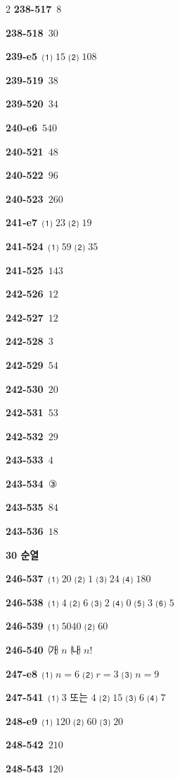 \documentclass[10pt,a4paper]{article}
\begin{document}
\begin{multicols}{2}
\noindent\textbf{238-517}\ $8$\par
\noindent\textbf{238-518}\ $30$\par
\noindent\textbf{239-e5}\ ⑴ $15$ ⑵ $108$\par
\noindent\textbf{239-519}\ $38$\par
\noindent\textbf{239-520}\ $34$\par
\noindent\textbf{240-e6}\ $540$\par
\noindent\textbf{240-521}\ $48$\par
\noindent\textbf{240-522}\ $96$\par
\noindent\textbf{240-523}\ $260$\par
\noindent\textbf{241-e7}\ ⑴ $23$ ⑵ $19$\par
\noindent\textbf{241-524}\ ⑴ $59$ ⑵ $35$\par
\noindent\textbf{241-525}\ $143$\par
\noindent\textbf{242-526}\ $12$\par
\noindent\textbf{242-527}\ $12$\par
\noindent\textbf{242-528}\ $3$\par
\noindent\textbf{242-529}\ $54$\par
\noindent\textbf{242-530}\ $20$\par
\noindent\textbf{242-531}\ $53$\par
\noindent\textbf{242-532}\ $29$\par
\noindent\textbf{243-533}\ $4$\par
\noindent\textbf{243-534}\ ③\par
\noindent\textbf{243-535}\ $84$\par
\noindent\textbf{243-536}\ $18$\par
\noindent\textbf{30 순열}\par\smallskip
\noindent\textbf{246-537}\ ⑴ $20$ ⑵ $1$ ⑶ $24$ ⑷ $180$\par
\noindent\textbf{246-538}\ ⑴ $4$ ⑵ $6$ ⑶ $2$ ⑷ $0$ ⑸ $3$ ⑹ $5$\par
\noindent\textbf{246-539}\ ⑴ $5040$ ⑵ $60$\par
\noindent\textbf{246-540}\ ㈎ $n$ ㈏ $n!$\par
\noindent\textbf{247-e8}\ ⑴ $n=6$ ⑵ $r=3$ ⑶ $n=9$\par
\noindent\textbf{247-541}\ ⑴ $3$ 또는 $4$ ⑵ $15$ ⑶ $6$ ⑷ $7$\par
\noindent\textbf{248-e9}\ ⑴ $120$ ⑵ $60$ ⑶ $20$\par
\noindent\textbf{248-542}\ $210$\par
\noindent\textbf{248-543}\ $120$\par

\end{multicols}
\end{document}
